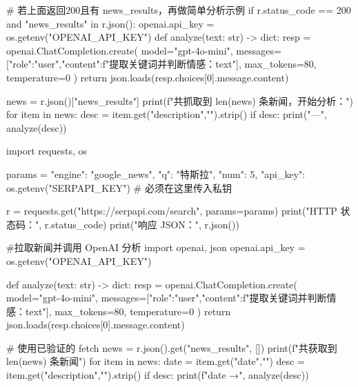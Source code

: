 # 若上面返回200且有 news_results，再做简单分析示例
if r.status_code == 200 and "news_results" in r.json():
    openai.api_key = os.getenv("OPENAI_API_KEY")
    def analyze(text: str) -> dict:
        resp = openai.ChatCompletion.create(
            model="gpt-4o-mini",
            messages=[{"role":"user","content":f"提取关键词并判断情感：{text}"}],
            max_tokens=80,
            temperature=0
        )
        return json.loads(resp.choices[0].message.content)
    
    news = r.json()["news_results"]
    print(f"共抓取到 {len(news)} 条新闻，开始分析：")
    for item in news:
        desc = item.get("description","").strip()
        if desc:
            print("—", analyze(desc))






import requests, os

params = {
    "engine":  "google_news",
    "q":       "特斯拉",
    "num":     5,
    "api_key": os.getenv("SERPAPI_KEY")   # 必须在这里传入私钥
}

r = requests.get("https://serpapi.com/search", params=params)
print("HTTP 状态码：", r.status_code)
print("响应 JSON：", r.json())







#拉取新闻并调用 OpenAI 分析
import openai, json
openai.api_key = os.getenv("OPENAI_API_KEY")

def analyze(text: str) -> dict:
    resp = openai.ChatCompletion.create(
        model="gpt-4o-mini",
        messages=[{"role":"user","content":f"提取关键词并判断情感：{text}"}],
        max_tokens=80,
        temperature=0
    )
    return json.loads(resp.choices[0].message.content)

# 使用已验证的 fetch
news = r.json().get("news_results", [])
print(f"共获取到 {len(news)} 条新闻")
for item in news:
    date = item.get("date","")
    desc = item.get("description","").strip()
    if desc:
        print(f"{date} →", analyze(desc))
